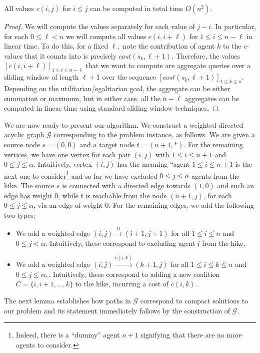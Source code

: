 \documentclass[a4paper,UKenglish,cleveref, autoref, thm-restate]{lipics-v2021}
\newcommand{\calG}{\mathcal{G}}
\newcommand{\cost}{\mathit{cost}}
\begin{document}
\begin{lemma}\label{lemma:cost-precomputation} All values $c(i, j)$ for $i \leq j$ can be computed in total time $O(n^2).$
\end{lemma}
\begin{proof} We will compute the values separately for each value of $j - i.$ In particular, for each $0 \leq \ell < n$ we will compute all values $c(i, i + \ell)$ for $1 \leq i \leq n - \ell$ in linear time. To do this, for a fixed $\ell,$ note the contribution of agent $k$ to the $c$-values that it counts into is precisely $\cost(s_k,\ell + 1).$ Therefore, the values $[c(i, i + \ell)]_{1 \leq i \leq n - \ell}$ that we want to compute are aggregate queries over a sliding window of length $\ell + 1$ over the sequence $[\cost(s_k,\ell + 1)]_{1 \leq k \leq n}.$ Depending on the utilitarian/egalitarian goal, the aggregate can be either summation or maximum, but in either case, all the $n - \ell$ aggregates can be computed in linear time using standard sliding window techniques.
\end{proof}
We are now ready to present our algorithm. We construct a weighted directed acyclic graph $\calG$ corresponding to the problem instance, as follows. We are given a source node $s=(0,0)$ and a target node $ t= (n+1, *)$.
For the remaining vertices, we have one vertex for each pair $(i, j)$ with $1 \leq i \leq n + 1$ and $0 \leq j \leq \alpha$. Intuitively, vertex $(i, j)$ has the meaning ``agent $1 \leq i \leq n + 1$  is the next one to consider\footnote{Indeed, there is a ``dummy'' agent $n + 1$ signifying that there are no more agents to consider.} and so far we have excluded $0 \leq j \leq \alpha$ agents from the hike. 
The source $s$ is connected with a directed edge towards $(1,0)$ and such an edge has weight $0$, while $t$ is reachable from the node $(n+1, j)$, for each $0 \leq j \leq \alpha$, via an edge of weight $0$.
For the remaining edges, we add the following two types:
\begin{itemize}
\item We add a weighted edge $(i, j) \xrightarrow{0} (i + 1, j + 1)$ for all $1 \leq i \leq n$ and $0 \leq j < \alpha$. Intuitively, these correspond to excluding agent $i$ from the hike.
\item We add a weighted edge $(i, j) \xrightarrow{c(i, k)}(k + 1, j)$ for all $1 \leq i \leq k \leq n$ and $0 \leq j \leq \alpha,$. Intuitively, these correspond to adding a new coalition $C = \{i, i + 1, \ldots, k\}$ to the hike, incurring a cost of $c(i, k).$ 
\end{itemize}
\noindent The next lemma establishes how paths in $\calG$ correspond to compact solutions to our problem and its statement immediately follows by the construction of $\calG$.
\end{document}

